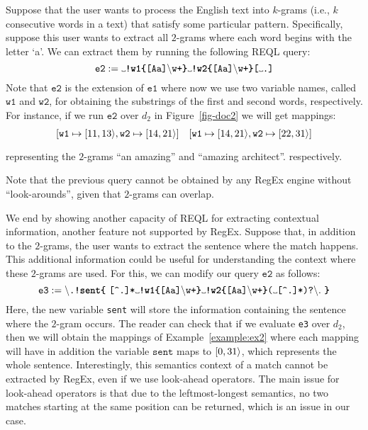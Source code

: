 \begin{example} \label{example:ex2} Suppose that the user wants to process the
	English text into $k$-grams (i.e., $k$ consecutive words in a text) that
	satisfy some particular pattern. Specifically, suppose this user wants to
	extract all $2$-grams where each word begins with the letter `a'. We can
	extract them by running the following REQL query:
	$$
	\texttt{e2} := \Vtextvisiblespace \texttt{\textbf{!w1\{}[Aa]}\backslash \texttt{w+\textbf{\}}}\Vtextvisiblespace \texttt{\textbf{!w2\{}[Aa]}\backslash \texttt{w+\textbf{\}}[}\Vtextvisiblespace \texttt{.]}
	$$
	Note that $\texttt{e2}$ is the extension of $\texttt{e1}$ where now we use
	two variable names, called $\texttt{w1}$ and $\texttt{w2}$, for obtaining
	the substrings of the first and second words, respectively. For instance, if
	we run $\texttt{e2}$ over $d_2$ in Figure~\ref{fig-doc2} we will get
	mappings:
	$$
	\begin{array}{cc}
		[\texttt{w1} \mapsto \Span{11}{13}, \texttt{w2} \mapsto \Span{14}{21}] & 
		{[}\texttt{w1} \mapsto \Span{14}{21}, \texttt{w2} \mapsto \Span{22}{31}] \vspace{1mm}\\
	\end{array}
	$$
	representing the $2$-grams ``an amazing'' and ``amazing architect''.%
	respectively.
\end{example}
Note that the previous query cannot be obtained by any RegEx engine without
``look-arounds'', given that $2$-grams can overlap. %
\begin{example}\label{example:ex3} We end by showing another capacity of REQL
	for extracting contextual information, another feature not supported by
	RegEx. Suppose that, in addition to the $2$-grams, the user wants to extract
	the sentence where the match happens. This additional information could be
	useful for understanding the context where these $2$-grams are used. For
	this, we can modify our query $\texttt{e2}$ as follows:
$$
\texttt{e3}  :=  \backslash \texttt{.}\texttt{\textbf{!sent\{}} \ \texttt{[\textasciicircum .]*} \Vtextvisiblespace \texttt{\textbf{!w1\{}[Aa]}\backslash \texttt{w+\textbf{\}}}\Vtextvisiblespace \texttt{\textbf{!w2\{}[Aa]}\backslash \texttt{w+\textbf{\}}}  \texttt{(}\Vtextvisiblespace\texttt{[\textasciicircum .]*)?}\backslash .  \ \texttt{\textbf{\}}}
$$
	Here, the new variable \texttt{sent} will store the information containing
	the sentence where the $2$-gram occurs. The reader can check that if we
	evaluate \texttt{e3} over $d_2$, then we will obtain the mappings of
	Example~\ref{example:ex2} where each mapping will have in addition the
	variable $\texttt{sent}$ maps to $[0, 31\rangle$, which represents the whole
	sentence. Interestingly, this semantics context of a match cannot be
	extracted by RegEx, even if we use look-ahead operators. The main issue for
	look-ahead operators is that due to the leftmost-longest semantics, no two
	matches starting at the same position can be returned, which is an issue in
	our case.
\end{example}

